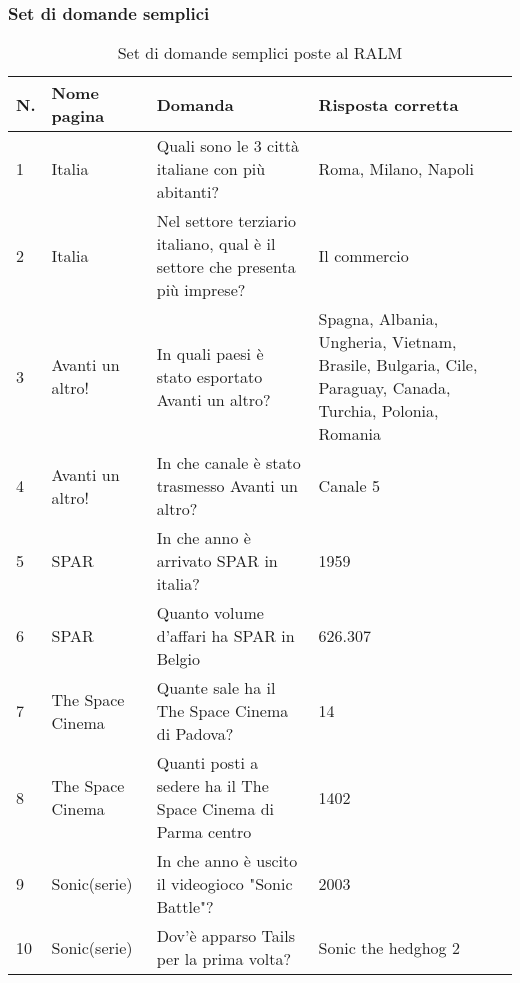 \subsubsection{Set di domande semplici}
\begin{table}[H]
    \centering
    \begin{tabular}{|p{0.5cm} |p{2.5cm} |p{4cm}| p{4.5cm}|}
        \hline
        \textbf{N}. & \textbf{Nome pagina} & \textbf{Domanda} & \textbf{Risposta corretta} \\
        \hline
        1 & Italia & Quali sono le 3 città italiane con più abitanti? & Roma, Milano, Napoli \\
        \hline
        2 & Italia & Nel settore terziario italiano, qual è il settore che presenta più imprese? & Il commercio \\
        \hline
        3 & Avanti un altro! & In quali paesi è stato esportato Avanti un altro? & Spagna, Albania, Ungheria, Vietnam, Brasile, Bulgaria, Cile, Paraguay, Canada, Turchia, Polonia, Romania \\
        \hline
        4 & Avanti un altro! & In che canale è stato trasmesso Avanti un altro? & Canale 5\\
        \hline
        5 & SPAR & In che anno è arrivato SPAR in italia? & 1959 \\
        \hline
        6 & SPAR & Quanto volume d'affari ha SPAR in Belgio & 626.307 \\
        \hline
        7 & The Space Cinema & Quante sale ha il The Space Cinema di Padova? & 14 \\
        \hline
        8 & The Space Cinema & Quanti posti a sedere ha il The Space Cinema di Parma centro & 1402 \\
        \hline
        9 & Sonic(serie) & In che anno è uscito il videogioco "Sonic Battle"? & 2003 \\
        \hline
        10 & Sonic(serie) & Dov'è apparso Tails per la prima volta? & Sonic the hedghog 2 \\
        \hline
    \end{tabular}
    \caption{Set di domande semplici poste al RALM}
\end{table}

